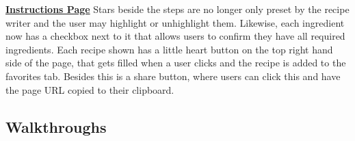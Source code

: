 \documentclass[11pt,english]{article}
\begin{document}
\newline
\newline
\textbf{\underline{Instructions Page}}
\newline
\newline
Stars beside the steps are no longer only preset by the recipe writer and the user may highlight or unhighlight them. Likewise, each ingredient now has a checkbox next to it that allows users to confirm they have all required ingredients. Each recipe shown has a little heart button on the top right hand side of the page, that gets filled when a user clicks and the recipe is added to the favorites tab. Besides this is a share button, where users can click this and have the page URL copied to their clipboard.
\newline
\newline
\newpage
\subsection{Walkthroughs}
\end{document}
